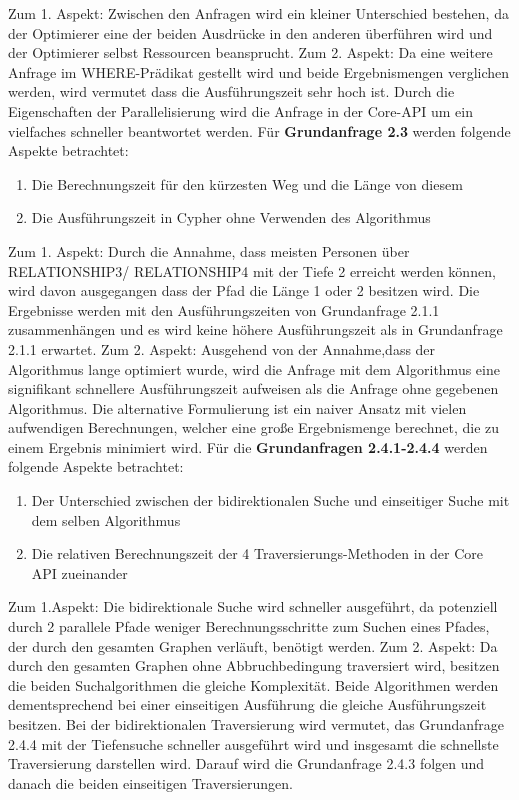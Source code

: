 Zum 1. Aspekt: Zwischen den Anfragen wird ein kleiner Unterschied bestehen, da der Optimierer eine der beiden Ausdrücke in den anderen überführen wird und der Optimierer selbst Ressourcen beansprucht. \newline
Zum 2. Aspekt: Da eine weitere Anfrage im WHERE-Prädikat gestellt wird und beide Ergebnismengen verglichen werden, wird vermutet dass die Ausführungszeit sehr hoch ist. Durch die Eigenschaften der Parallelisierung wird die Anfrage in der Core-API um ein vielfaches schneller beantwortet werden. \newline  \newline
Für \textbf{Grundanfrage 2.3} werden folgende Aspekte betrachtet: 
\begin{enumerate}
	\item Die Berechnungszeit für den kürzesten Weg und die Länge von diesem
	\item Die Ausführungszeit in Cypher ohne Verwenden des Algorithmus
\end{enumerate}
Zum 1. Aspekt: Durch die Annahme, dass meisten Personen über RELATIONSHIP3/ RELATIONSHIP4 mit der Tiefe 2 erreicht werden können, wird davon ausgegangen dass der Pfad die Länge 1 oder 2 besitzen  wird. Die Ergebnisse werden mit den Ausführungszeiten von Grundanfrage 2.1.1 zusammenhängen und es wird keine höhere Ausführungszeit als in Grundanfrage 2.1.1 erwartet. \newline
Zum 2. Aspekt: Ausgehend von der Annahme,dass der Algorithmus lange optimiert wurde, wird die Anfrage mit dem Algorithmus eine signifikant schnellere Ausführungszeit aufweisen als die Anfrage ohne gegebenen Algorithmus. Die alternative Formulierung ist ein naiver Ansatz mit vielen aufwendigen Berechnungen, welcher eine große Ergebnismenge berechnet, die zu einem Ergebnis minimiert wird. \newline \newline
Für die \textbf{Grundanfragen 2.4.1-2.4.4} werden folgende Aspekte betrachtet:
\begin{enumerate}
	\item Der Unterschied zwischen der bidirektionalen Suche und einseitiger Suche mit dem selben Algorithmus
	\item Die relativen Berechnungszeit der 4 Traversierungs-Methoden in der Core API zueinander
\end{enumerate}
Zum 1.Aspekt: Die bidirektionale Suche wird schneller ausgeführt, da potenziell durch 2 parallele Pfade  weniger Berechnungsschritte zum Suchen eines Pfades, der  durch den gesamten Graphen verläuft, benötigt werden. \newline 
Zum 2. Aspekt: Da durch den gesamten Graphen ohne Abbruchbedingung traversiert wird, besitzen die beiden Suchalgorithmen die gleiche Komplexität. Beide Algorithmen werden dementsprechend bei einer einseitigen Ausführung die gleiche Ausführungszeit besitzen. Bei der bidirektionalen Traversierung wird vermutet, das Grundanfrage 2.4.4 mit der Tiefensuche schneller ausgeführt wird und insgesamt die schnellste Traversierung darstellen wird. Darauf wird die Grundanfrage 2.4.3 folgen und danach die beiden einseitigen Traversierungen. 
